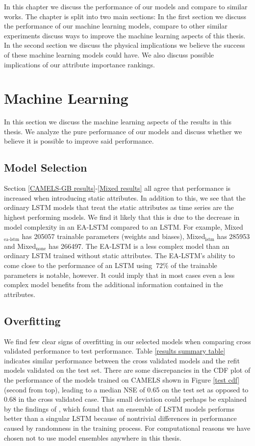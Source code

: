 In this chapter we discuss the performance of our models and compare to similar 
works. The chapter is split into two main sections: In the first section we 
discuss the performance of our machine learning models, compare to other similar 
experiments discuss ways to improve the machine learning aspects of this thesis.
In the second section we discuss the physical implications we believe the success 
of these machine learning models could have. We also discuss possible implications 
of our attribute importance rankings. 
\section{Machine Learning}
In this section we discuss the machine learning aspects of the results in this thesis.
We analyze the pure performance of our models and discuss whether we believe it 
is possible to improve said performance.
\subsection{Model Selection}
\label{discuss model selection}
Section \ref{CAMELS-GB results}-\ref{Mixed results} 
all agree that performance is increased when introducing static attributes. In 
addition to this, we see that the ordinary LSTM models that treat the static 
attributes as time series are the highest performing models. We find it likely that 
this is due  to the decrease in model complexity in an EA-LSTM compared to an LSTM. 
For example, Mixed$_\text{ea-lstm}$ has 205057 trainable parameters (weights and 
biases), Mixed$_\text{lstm}$ has 285953 and Mixed$_\text{none}$ has 266497. The 
EA-LSTM is a less complex model than an ordinary LSTM trained without 
static attributes. The EA-LSTM's ability to come close to the performance of an 
LSTM using $~72\%$ of the trainable parameters is notable, however. It could imply 
that in most cases even a less complex model benefits from the additional information 
contained in the attributes.
\subsection{Overfitting}
We find few clear signs of overfitting in our selected models when comparing 
cross validated performance to test performance. Table 
\ref{results summary table} indicates 
similar performance between the cross validated models and the refit models 
validated on the test set. There are some discrepancies in the CDF plot of 
the performance of the models trained on CAMELS 
shown in Figure \ref{test cdf} (second from top), leading to a median NSE of 
0.65 on the test set as opposed to $0.68$ in the cross validated case. This small 
deviation could perhaps be explained by the findings of \citet{lstm_second_paper},
 which found that an ensemble of LSTM models performs better than a singular LSTM 
 because of nontrivial differences in performance caused by randomness in the 
 training process. For computational reasons we have chosen not to use model 
 ensembles anywhere in this thesis.

